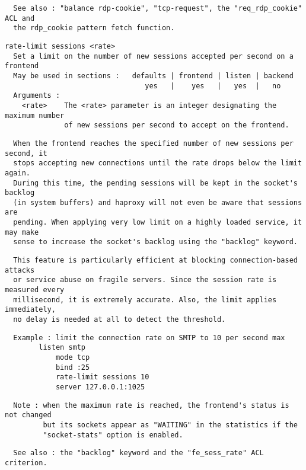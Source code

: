 \begin{verbatim}
  See also : "balance rdp-cookie", "tcp-request", the "req_rdp_cookie" ACL and
  the rdp_cookie pattern fetch function.
\end{verbatim}

\begin{verbatim}
rate-limit sessions <rate>
  Set a limit on the number of new sessions accepted per second on a frontend
  May be used in sections :   defaults | frontend | listen | backend
                                 yes   |    yes   |   yes  |   no
  Arguments :
    <rate>    The <rate> parameter is an integer designating the maximum number
              of new sessions per second to accept on the frontend.
\end{verbatim}

\begin{verbatim}
  When the frontend reaches the specified number of new sessions per second, it
  stops accepting new connections until the rate drops below the limit again.
  During this time, the pending sessions will be kept in the socket's backlog
  (in system buffers) and haproxy will not even be aware that sessions are
  pending. When applying very low limit on a highly loaded service, it may make
  sense to increase the socket's backlog using the "backlog" keyword.
\end{verbatim}

\begin{verbatim}
  This feature is particularly efficient at blocking connection-based attacks
  or service abuse on fragile servers. Since the session rate is measured every
  millisecond, it is extremely accurate. Also, the limit applies immediately,
  no delay is needed at all to detect the threshold.
\end{verbatim}

\begin{verbatim}
  Example : limit the connection rate on SMTP to 10 per second max
        listen smtp
            mode tcp
            bind :25
            rate-limit sessions 10
            server 127.0.0.1:1025
\end{verbatim}

\begin{verbatim}
  Note : when the maximum rate is reached, the frontend's status is not changed
         but its sockets appear as "WAITING" in the statistics if the
         "socket-stats" option is enabled.
\end{verbatim}

\begin{verbatim}
  See also : the "backlog" keyword and the "fe_sess_rate" ACL criterion.
\end{verbatim}

